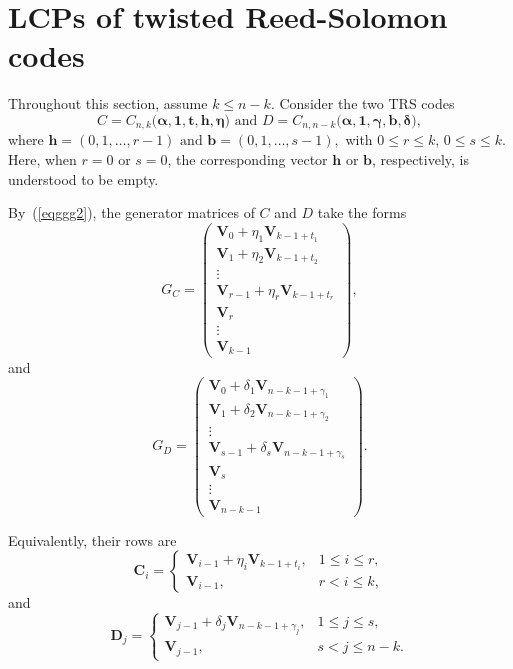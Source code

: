 \documentclass[12pt,draftcls,journal,onecolumn]{IEEEtran}
\begin{document}
\section{LCPs of twisted Reed-Solomon codes}

\renewcommand{\thetheorem}{\arabic{section}.\arabic{theorem}}
\setcounter{theorem}{0}

Throughout this section, assume
\(
k\le n-k.
\)
Consider the two TRS codes
\begin{equation}\label{eq:CD}
C=C_{n,k}\bigl(\boldsymbol{\alpha},\mathbf{1},
\boldsymbol{t},\boldsymbol{h},\boldsymbol{\eta}\bigr)
\text{ and }
D=C_{n,n-k}\bigl(\boldsymbol{\alpha},\mathbf{1},
\boldsymbol{\gamma},\boldsymbol{b},\boldsymbol{\delta}\bigr),
\end{equation}
where
\(
\boldsymbol{h}=(0,1,\ldots,r-1)
\text{ and }
\boldsymbol{b}=(0,1,\ldots,s-1),
\)
with
\(0\le r\le k\), \(0\le s\le k\).
Here, when \(r=0\) or \(s=0\), the corresponding vector
\(\boldsymbol{h}\) or \(\boldsymbol{b}\), respectively, is understood
to be empty.

By~(\ref{eqggg2}), the generator matrices of \(C\) and \(D\) take
the forms
\begin{equation*}
G_C=
\begin{pmatrix}
\mathbf{V}_0+\eta_1\mathbf{V}_{k-1+t_1}\\
\mathbf{V}_1+\eta_2\mathbf{V}_{k-1+t_2}\\
\vdots\\
\mathbf{V}_{r-1}+\eta_r\mathbf{V}_{k-1+t_r}\\
\mathbf{V}_r\\
\vdots\\
\mathbf{V}_{k-1}
\end{pmatrix},
\end{equation*}
and
\begin{equation*}
G_D=
\begin{pmatrix}
\mathbf{V}_0+\delta_1\mathbf{V}_{n-k-1+\gamma_1}\\
\mathbf{V}_1+\delta_2\mathbf{V}_{n-k-1+\gamma_2}\\
\vdots\\
\mathbf{V}_{s-1}+\delta_s\mathbf{V}_{n-k-1+\gamma_s}\\
\mathbf{V}_s\\
\vdots\\
\mathbf{V}_{n-k-1}
\end{pmatrix}.
\end{equation*}

Equivalently, their rows are
\begin{equation}\label{eq:0821}
\mathbf{C}_i=
\begin{cases}
\mathbf{V}_{i-1}+\eta_i\mathbf{V}_{k-1+t_i},&1\le i\le r,\\
\mathbf{V}_{i-1},&r<i\le k,
\end{cases}
\end{equation}
and
\begin{equation}\label{eq:082101}
\mathbf{D}_j=
\begin{cases}
\mathbf{V}_{j-1}+\delta_j\mathbf{V}_{n-k-1+\gamma_j},&1\le j\le s,\\
\mathbf{V}_{j-1},&s<j\le n-k.
\end{cases}
\end{equation}
\end{document}
